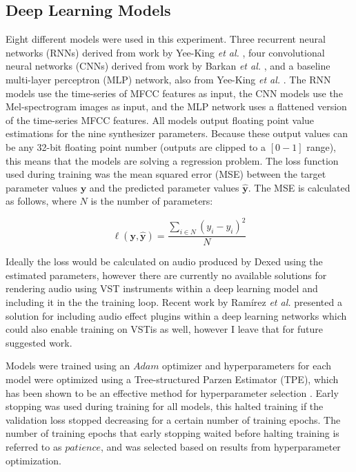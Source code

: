 \subsection{Deep Learning Models}
Eight different models were used in this experiment. Three recurrent neural networks (RNNs) derived from work by Yee-King \textit{et al.} \cite{yee2018automatic}, four convolutional neural networks (CNNs) derived from work by Barkan \textit{et al.} \cite{barkan2019inversynth}, and a baseline multi-layer perceptron (MLP) network, also from Yee-King \textit{et al.} \cite{yee2018automatic}. The RNN models use the time-series of MFCC features as input, the CNN models use the Mel-spectrogram images as input, and the MLP network uses a flattened version of the time-series MFCC features. All models output floating point value estimations for the nine synthesizer parameters. Because these output values can be any 32-bit floating point number (outputs are clipped to a $[0-1]$ range), this means that the models are solving a regression problem. The loss function used during training was the mean squared error (MSE) between the target parameter values $\textbf{y}$ and the predicted parameter values $\hat{\textbf{y}}$. The MSE is calculated as follows, where $N$ is the number of parameters:

\begin{equation}\label{equation:mse}
    \ell(\textbf{y}, \hat{\textbf{y}}) = \frac{\sum_{i \in N}{(y_i - \hat{y_i})^2}}{N}
\end{equation}

Ideally the loss would be calculated on audio produced by Dexed using the estimated parameters, however there are currently no available solutions for rendering audio using VST instruments within a deep learning model and including it in the the training loop. Recent work by Ramírez \textit{et al.} presented a solution for including audio effect plugins within a deep learning networks \cite{ramirez2021differentiable} which could also enable training on VSTis as well, however I leave that for future suggested work. 

Models were trained using an $Adam$ optimizer \cite{kingma2014adam} and hyperparameters for each model were optimized using a  Tree-structured Parzen Estimator (TPE), which has been shown to be an effective method for hyperparameter selection \cite{bergstra2011algorithms}. Early stopping was used during training for all models, this halted training if the validation loss stopped decreasing for a certain number of training epochs. The number of training epochs that early stopping waited before halting training is referred to as $patience$, and was selected based on results from hyperparameter optimization.

